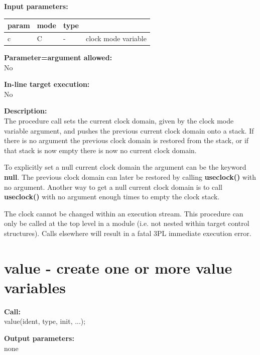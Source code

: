         {\bf Input parameters:} \\
        \begin{tabular}{| l | l | l | l |}
        \hline
        param  & mode       & type  & \\
        \hline \hline
        c   & C  &  -    & clock mode variable \\ \hline
        \end{tabular}
        
        {\bf Parameter=argument allowed:} \\
        No
        
        {\bf In-line target execution:} \\
        No
        
        {\bf Description:} \\
        The procedure call sets the current clock domain, given by the clock
        mode variable argument, and pushes the previous current clock domain
        onto a stack. If there is no argument the previous clock domain is
        restored from the stack, or if that stack is now empty there is now no
        current clock domain.
        
        To explicitly set a null current clock domain the argument can
        be the keyword {\bf null}. The previous clock domain can later be
        restored by calling {\bf useclock()} with no argument. Another
        way to get a null current clock domain is to call {\bf useclock()}
        with no argument enough times to empty the clock stack.
        
        The clock cannot be changed within an execution stream. This procedure
        can only be called at the top level in a module (i.e. not nested within
        target control structures). Calls elsewhere will result in a fatal 3PL
        immediate execution error.


    \section{value - create one or more value variables}\label{sec:ipvalue}
        
        {\bf Call:} \\
        value(ident, type, init, ...);
        
        {\bf Output parameters:} \\
        none
        
